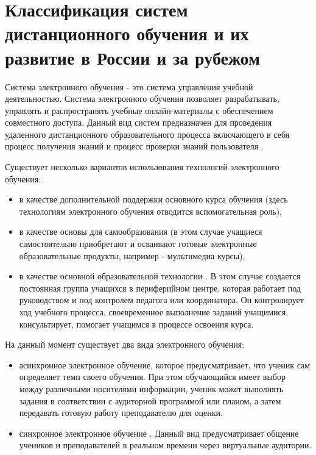 \section{Классификация систем дистанционного обучения и их развитие в России и за рубежом} \label{sect1_2}

Система электронного обучения - это система управления учебной деятельностью. Система электронного обучения позволяет разрабатывать, управлять и распространять учебные онлайн-материалы с обеспечением совместного доступа. Данный вид систем предназначен для проведения удаленного дистанционного образовательного процесса включающего в себя процесс получения знаний и процесс проверки знаний пользователя \cite{keegan1996foundations}.

Существует несколько вариантов использования технологий электронного обучения:

\begin{itemize}
\item в качестве дополнительной поддержки основного курса обучения (здесь технологиям электронного обучения отводится вспомогательная роль),
\item в качестве основы для самообразования (в этом случае учащиеся самостоятельно приобретают и осваивают готовые электронные образовательные продукты, например - мультимедиа курсы),
\item в качестве основной образовательной технологии \cite{mojaeva2000edu}. В этом случае создается постоянная группа учащихся в периферийном центре, которая работает под руководством и под контролем педагога или координатора. Он контролирует ход учебного процесса, своевременное выполнение заданий учащимися, консультирует, помогает учащимся в процессе освоения курса.
\end{itemize}

На данный момент существует два вида электронного обучения: 

\begin{itemize}
\item асинхронное электронное обучение, которое предусматривает, что ученик сам определяет темп своего обучения. При этом обучающийся имеет выбор между различными носителями информации, ученик может выполнять задания в соответствии с аудиторной программой или планом, а затем передавать готовую работу преподавателю для оценки.
\item синхронное электронное обучение \cite{azinadistance}. Данный вид предусматривает общение учеников и преподавателей в реальном времени через виртуальные аудитории. 
\end{itemize}

